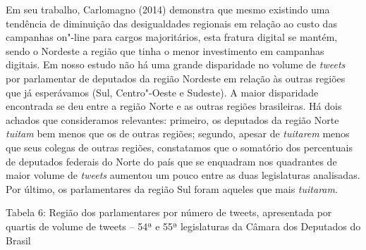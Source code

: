 Em seu trabalho, Carlomagno (2014) demonstra que mesmo existindo uma
tendência de diminuição das desigualdades regionais em relação ao custo
das campanhas on"-line para cargos majoritários, esta fratura digital se
mantém, sendo o Nordeste a região que tinha o menor investimento em
campanhas digitais. Em nosso estudo não há uma grande disparidade no
volume de \emph{tweets} por parlamentar de deputados da região Nordeste
em relação às outras regiões que já esperávamos (Sul, Centro"-Oeste e
Sudeste). A maior disparidade encontrada se deu entre a região Norte e
as outras regiões brasileiras. Há dois achados que consideramos
relevantes: primeiro, os deputados da região Norte \emph{tuitam} bem
menos que os de outras regiões; segundo, apesar de \emph{tuitarem} menos
que seus colegas de outras regiões, constatamos que o somatório dos
percentuais de deputados federais do Norte do país que se enquadram nos
quadrantes de maior volume de \emph{tweets} aumentou um pouco entre as
duas legislaturas analisadas. Por último, os parlamentares da região Sul
foram aqueles que mais \emph{tuitaram}.

\begin{center}
Tabela 6: Região dos parlamentares por número de tweets,
apresentada por quartis de volume de tweets -- 54ª e 55ª legislaturas da
Câmara dos Deputados do Brasil
\end{center}

